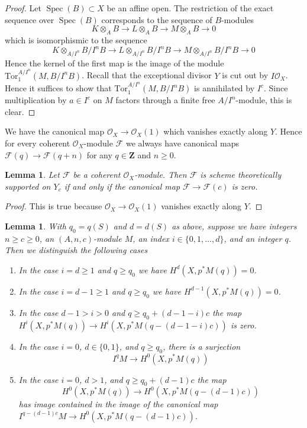 \documentclass{stacks-project}
\theoremstyle{plain}
\newtheorem{lemma}[subsection]{Lemma}
\theoremstyle{definition}
\theoremstyle{remark}
\numberwithin{equation}{subsection}
\def\Spec{\mathop{\mathrm{Spec}}}
\begin{document}
\begin{proof}
Let $\Spec(B) \subset X$ be an affine open. The restriction of the exact
sequence over $\Spec(B)$ corresponds to the sequence of $B$-modules
$$
K \otimes_A B \to L \otimes_A B \to M \otimes_A B \to 0
$$
which is isomorphismic to the sequence
$$
K \otimes_{A/I^n} B/I^nB \to
L \otimes_{A/I^n} B/I^nB \to
M \otimes_{A/I^n} B/I^nB \to 0
$$
Hence the kernel of the first map is the image of the module
$\text{Tor}_1^{A/I^n}(M, B/I^nB)$. Recall that the exceptional
divisor $Y$ is cut out by $I\mathcal{O}_X$. 
Hence it suffices to show that
$\text{Tor}_1^{A/I^n}(M, B/I^nB)$ is annihilated by $I^c$. Since
multiplication by $a \in I^c$ on $M$ factors through a finite
free $A/I^n$-module, this is clear.
\end{proof}

\noindent
We have the canonical map $\mathcal{O}_X \to \mathcal{O}_X(1)$
which vanishes exactly along $Y$.
Hence for every coherent $\mathcal{O}_X$-module $\mathcal{F}$
we always have canonical maps
$\mathcal{F}(q) \to \mathcal{F}(q + n)$ for any $q \in \mathbf{Z}$
and $n \geq 0$.

\begin{lemma}
\label{lemma-annihilated}
Let $\mathcal{F}$ be a coherent $\mathcal{O}_X$-module.
Then $\mathcal{F}$ is scheme theoretically
supported on $Y_c$ if and only if the canonical map
$\mathcal{F} \to \mathcal{F}(c)$ is zero.
\end{lemma}

\begin{proof}
This is true because $\mathcal{O}_X \to \mathcal{O}_X(1)$
vanishes exactly along $Y$.
\end{proof}

\begin{lemma}
\label{lemma-vanishing-coh-almost-projective}
With $q_0 = q(S)$ and $d = d(S)$ as above, suppose we have
integers $n \geq c \geq 0$, an $(A, n, c)$-module $M$,
an index $i \in \{0, 1, \ldots, d\}$, and an integer $q$.
Then we distinguish the following cases
\begin{enumerate}
\item In the case $i = d \geq 1$ and $q \geq q_0$ we have
$H^d(X, p^*M(q)) = 0$.
\item In the case $i = d - 1 \geq 1$ and $q \geq q_0$ we have
$H^{d - 1}(X, p^*M(q)) = 0$.
\item In the case $d - 1 > i > 0$ and $q \geq q_0 + (d - 1 - i)c$
the map
$H^i(X, p^*M(q)) \to H^i(X, p^*M(q - (d - 1 - i)c))$
is zero.
\item In the case $i = 0$, $d \in \{0, 1\}$, and $q \geq q_0$, there
is a surjection
$$
I^qM \longrightarrow H^0(X, p^*M(q))
$$
\item In the case $i = 0$, $d > 1$, and $q \geq q_0 + (d - 1)c$ the map
$$
H^0(X, p^*M(q)) \to H^0(X, p^*M(q - (d - 1)c))
$$
has image contained in the image of the canonical map
$I^{q - (d - 1)c}M \to H^0(X, p^*M(q - (d - 1)c))$.
\end{enumerate}
\end{lemma}
\end{document}
